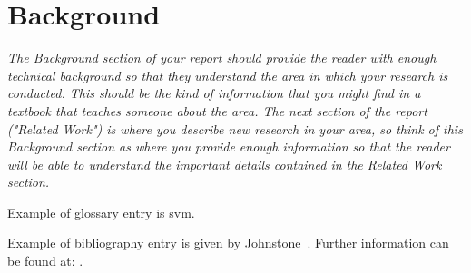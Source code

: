 \section{Background} 

\emph{The Background section of your report should provide the reader with enough technical background so that they understand the area in which your research is conducted. This should be the kind of information that you might find in a textbook that teaches someone about the area. The next section of the report ("Related Work") is where you describe new research in your area, so think of this Background section as where you provide enough information so that the reader will be able to understand the important details contained in the Related Work section.}

Example of glossary entry is \gls{svm}.

Example of bibliography entry is given by Johnstone~\cite{Joh11}.
Further information can be found at: \cite{website:fermentas-lambda}.


